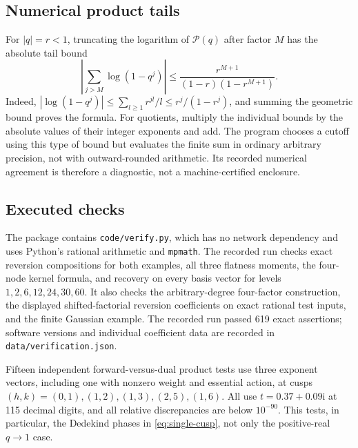 \documentclass[11pt,a4paper]{article}
\numberwithin{equation}{section}
\theoremstyle{definition}\newtheorem{definition}[theorem]{Definition}
\theoremstyle{remark}\newtheorem{remark}[theorem]{Remark}
\newcommand{\ii}{\mathrm i}\newcommand{\e}{\mathrm e}
\newcommand{\Poch}{\mathcal P}\newcommand{\F}{\mathcal F}
\begin{document}
\subsection{Numerical product tails}
For $|q|=r<1$, truncating the logarithm of $\Poch(q)$ after factor $M$
has the absolute tail bound
\begin{equation}\label{eq:product-tail}
 \left|\sum_{j>M}\log(1-q^j)\right|
 \le\frac{r^{M+1}}{(1-r)(1-r^{M+1})}.
\end{equation}
Indeed, $|\log(1-q^j)|\le\sum_{l\ge1}r^{jl}/l
\le r^j/(1-r^j)$, and summing the geometric bound proves the formula.
For quotients, multiply the individual bounds by the absolute values of
their integer exponents and add. The program chooses a cutoff using
this type of bound but evaluates the finite sum in ordinary arbitrary
precision, not with outward-rounded arithmetic. Its recorded numerical
agreement is therefore a diagnostic, not a machine-certified enclosure.

\subsection{Executed checks}
The package contains \texttt{code/verify.py}, which has no network
dependency and uses Python's rational arithmetic and \texttt{mpmath}.
The recorded run checks exact reversion compositions for both examples,
all three flatness moments, the four-node kernel formula, and recovery
on every basis vector for levels $1,2,6,12,24,30,60$. It also checks the
arbitrary-degree four-factor construction, the displayed shifted-factorial
reversion coefficients on exact rational test inputs, and the finite
Gaussian example. The recorded run passed 619 exact assertions; software versions and
individual coefficient data are recorded in \texttt{data/verification.json}.

Fifteen independent forward-versus-dual product tests use three exponent
vectors, including one with nonzero weight and essential action, at
cusps $(h,k)=(0,1),(1,2),(1,3),(2,5),(1,6)$. All use
$t=0.37+0.09\ii$ at 115 decimal digits, and all relative discrepancies
are below $10^{-90}$. This tests, in particular, the Dedekind phases in
\eqref{eq:single-cusp}, not only the positive-real $q\to1$ case.
\end{document}
